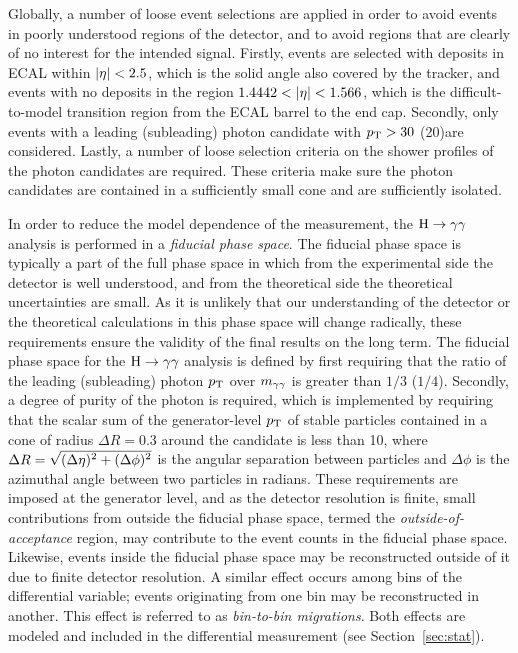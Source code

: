 Globally, a number of loose event selections are applied in order to avoid events in poorly understood regions of the detector, and to avoid regions that are clearly of no interest for the intended signal.
% 
Firstly, events are selected with deposits in ECAL within $\left| \eta \right |<2.5$,
% 
which is the solid angle also covered by the tracker,
% 
and events with no deposits in the region $1.4442 < \left| \eta \right | < 1.566$, which is the difficult-to-model transition region from the ECAL barrel to the end cap.
% 
Secondly, only events with a leading (subleading) photon candidate with $p_\mathrm{T} > 30$ (20)\GeV are considered.
% 
Lastly, a number of loose selection criteria on the shower profiles of the photon candidates are required.
% 
These criteria make sure the photon candidates are contained in a sufficiently small cone and are sufficiently isolated.


In order to reduce the model dependence of the measurement, the $\mathrm{H}\to\mathrm{\gamma}\mathrm{\gamma}$ analysis is performed in a \textit{fiducial phase space}.
% 
The fiducial phase space is typically a part of the full phase space in which from the experimental side the detector is well understood, and from the theoretical side the theoretical uncertainties are small.
% 
As it is unlikely that our understanding of the detector or the theoretical calculations in this phase space will change radically, these requirements ensure the validity of the final results on the long term.
% 
The fiducial phase space for the $\mathrm{H}\to\mathrm{\gamma}\mathrm{\gamma}$ analysis is defined by first requiring that the ratio of the leading (subleading) photon $p_\mathrm{T}$ over $m_{\mathrm{\gamma}\mathrm{\gamma}}$ is greater than $1/3$ ($1/4$).
% 
Secondly, a degree of purity of the photon is required, which is implemented by requiring that the scalar sum of the generator-level $p_\mathrm{T}$ of stable particles contained in a cone of radius $\Delta R=0.3$ around the candidate is less than 10\GeV, where $\Delta R = \sqrt{\smash[b]{(\Delta\eta)^2+(\Delta\phi)^2}}$ is the angular separation between particles and $\Delta\phi$ is the azimuthal angle between two particles in radians.
% 
These requirements are imposed at the generator level, and as the detector resolution is finite, small contributions from outside the fiducial phase space, termed the \textit{outside-of-acceptance} region, may contribute to the event counts in the fiducial phase space.
% 
Likewise, events inside the fiducial phase space may be reconstructed outside of it due to finite detector resolution.
% 
A similar effect occurs among bins of the differential variable; events originating from one bin may be reconstructed in another.
% 
This effect is referred to as \textit{bin-to-bin migrations}.
% 
Both effects are modeled and included in the differential measurement (see Section~\ref{sec:stat}).



